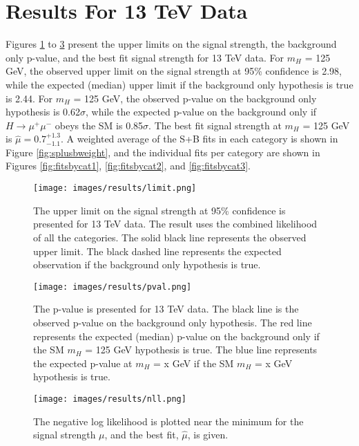 \section{Results For 13 TeV Data}
Figures \ref{fig:limit13} to \ref{fig:signalstrength13} present the upper limits on the signal strength, the background only p-value, and the best fit signal strength for 13 TeV data. For $m_H$ = 125 GeV, the observed upper limit on the signal strength at 95\% confidence is 2.98, while the expected (median) upper limit if the background only hypothesis is true is 2.44. For $m_H$ = 125 GeV, the observed p-value on the background only hypothesis is 0.62$\sigma$, while the expected p-value on the background only if $H\rightarrow\mu^+\mu^-$ obeys the SM is 0.85$\sigma$. The best fit signal strength at $m_H$ = 125 GeV is $\hat{\mu} = 0.7^{+1.3}_{-1.1}$. A weighted average of the S+B fits in each category is shown in Figure \ref{fig:splusbweight}, and the individual fits per category are shown in Figures \ref{fig:fitsbycat1}, \ref{fig:fitsbycat2}, and \ref{fig:fitsbycat3}. 
\begin{figure}[h!]
    \centering
    \texttt{[image: images/results/limit.png]}
    \caption[The upper limit on the signal strength for 13 TeV data alone.]
    {The upper limit on the signal strength at 95\% confidence is presented for 13 TeV data. The result uses the combined likelihood of all the categories. The solid black line represents the observed upper limit. The black dashed line represents the expected observation if the background only hypothesis is true.}
    \label{fig:limit13}
\end{figure}
\begin{figure}[h!]
    \centering
    \texttt{[image: images/results/pval.png]}
    \caption[The p-value on the background-only hypothesis using 13 TeV data alone.]
    {The p-value is presented for 13 TeV data. The black line is the observed p-value on the background only hypothesis. The red line represents the expected (median) p-value on the background only if the SM $m_H$ = 125 GeV hypothesis is true. The blue line represents the expected p-value at $m_H$ = x GeV if the SM $m_H$ = x GeV hypothesis is true.}
    \label{fig:pval13}
\end{figure}
\begin{figure}[h!]
    \centering
    \texttt{[image: images/results/nll.png]}
    \caption[A plot of the negative log likelihood near the minimum for the signal strength.]
    {The negative log likelihood is plotted near the minimum for the signal strength $\mu$, and the best fit, $\hat{\mu}$, is given.}
    \label{fig:signalstrength13}
\end{figure}
